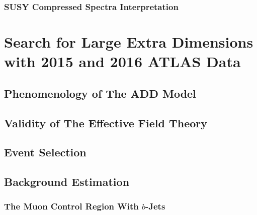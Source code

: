 \documentclass[10pt,twoside,cucitura,classica,english,openany]{toptesi}
\begin{document}


\subsection{SUSY Compressed Spectra Interpretation}
\label{sec:interpretation}



\chapter{Search for Large Extra Dimensions with 2015 and 2016 ATLAS Data}
\label{cha:2016-monoj-analys}

\section{Phenomenology of The ADD Model}
\label{sec:phen-add-model}



\section{Validity of The Effective Field Theory}
\label{sec:valid-effect-field}



\section{Event Selection}
\label{sec:event-selection-1}




% 

\section{Background Estimation}
\label{sec:backgr-estim}



\subsection{The Muon Control Region With $b$-Jets}
\label{sec:muon-cr-bjet}
\end{document}
